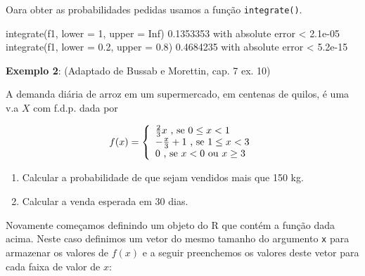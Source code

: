 \documentclass[
  10pt,
  a4paper]{book}
\newenvironment{Shaded}{\begin{snugshade}}{\end{snugshade}}
\newcommand{\AttributeTok}[1]{\textcolor[rgb]{0.77,0.63,0.00}{#1}}
\newcommand{\ConstantTok}[1]{\textcolor[rgb]{0.00,0.00,0.00}{#1}}
\newcommand{\DecValTok}[1]{\textcolor[rgb]{0.00,0.00,0.81}{#1}}
\newcommand{\FloatTok}[1]{\textcolor[rgb]{0.00,0.00,0.81}{#1}}
\newcommand{\FunctionTok}[1]{\textcolor[rgb]{0.00,0.00,0.00}{#1}}
\newcommand{\NormalTok}[1]{#1}
\newcommand{\SpecialCharTok}[1]{\textcolor[rgb]{0.00,0.00,0.00}{#1}}
\providecommand{\tightlist}{%
  \setlength{\itemsep}{0pt}\setlength{\parskip}{0pt}}
\begin{document}
Oara obter as probabilidades pedidas usamos a função \texttt{integrate()}.

\begin{Shaded}
\begin{Highlighting}[]
\FunctionTok{integrate}\NormalTok{(f1, }\AttributeTok{lower =} \DecValTok{1}\NormalTok{, }\AttributeTok{upper =} \ConstantTok{Inf}\NormalTok{)}
\FloatTok{0.1353353}\NormalTok{ with absolute error }\SpecialCharTok{\textless{}} \FloatTok{2.1e{-}05}
\FunctionTok{integrate}\NormalTok{(f1, }\AttributeTok{lower =} \FloatTok{0.2}\NormalTok{, }\AttributeTok{upper =} \FloatTok{0.8}\NormalTok{)}
\FloatTok{0.4684235}\NormalTok{ with absolute error }\SpecialCharTok{\textless{}} \FloatTok{5.2e{-}15}
\end{Highlighting}
\end{Shaded}

\textbf{Exemplo 2}: (Adaptado de Bussab e Morettin, cap. 7 ex. 10)

A demanda diária de arroz em um supermercado, em centenas de quilos, é
uma v.a \(X\) com f.d.p. dada por

\begin{eqnarray}
  f(x) = \left\{ \begin{array}{ll}
      \frac{2}{3}x \mbox{ , se $0 \leq x < 1$} \cr
      -\frac{x}{3} + 1 \mbox{ , se $ 1 \leq x < 3$} \cr
      0            \mbox{ , se $x < 0$  ou  $x \geq 3$}
    \end{array} \right.
\end{eqnarray}

\begin{enumerate}
\def\labelenumi{\alph{enumi}.}
\tightlist
\item
  Calcular a probabilidade de que sejam vendidos mais que 150 kg.
\item
  Calcular a venda esperada em 30 dias.
\end{enumerate}

Novamente começamos definindo um objeto do R que contém a função dada
acima. Neste caso definimos um vetor do mesmo tamanho do argumento \texttt{x}
para armazenar os valores de \(f(x)\) e a seguir preenchemos os valores
deste vetor para cada faixa de valor de \(x\):
\end{document}
